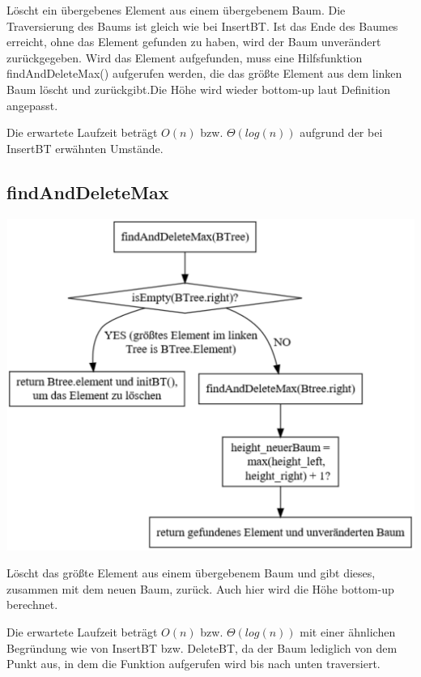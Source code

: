 \documentclass[11pt]{article}
\begin{document}
    Löscht ein übergebenes Element aus einem übergebenem Baum.
    Die Traversierung des Baums ist gleich wie bei InsertBT.
    Ist das Ende des Baumes erreicht, ohne das Element gefunden zu haben,
    wird der Baum unverändert zurückgegeben.
    Wird das Element aufgefunden, muss eine Hilfsfunktion findAndDeleteMax() aufgerufen werden, die das größte Element aus dem linken Baum löscht und zurückgibt.Die Höhe wird wieder bottom-up laut Definition angepasst.

    Die erwartete Laufzeit beträgt
    \begin{math}
        O(n)
    \end {math}
    bzw.
    \begin{math}
        \Theta (log (n))
    \end{math}
    aufgrund der bei InsertBT erwähnten Umstände.
    
    
    \subsection{findAndDeleteMax}\label{subsec:findanddeletemax}

    \begin{center}
        \includegraphics[width=0.8\columnwidth] {findanddeletemax.pdf}
    \end{center}

    Löscht das größte Element aus einem übergebenem Baum und gibt dieses, zusammen mit dem neuen Baum, zurück. Auch hier wird die Höhe bottom-up berechnet.

    Die erwartete Laufzeit beträgt
    \begin{math}
        O(n)
    \end {math}
    bzw.
    \begin{math}
        \Theta (log (n))
    \end{math}
    mit einer ähnlichen Begründung wie von InsertBT bzw. DeleteBT, da der Baum lediglich von dem Punkt aus, in dem die Funktion aufgerufen wird bis nach unten traversiert.
    
\end{document}
